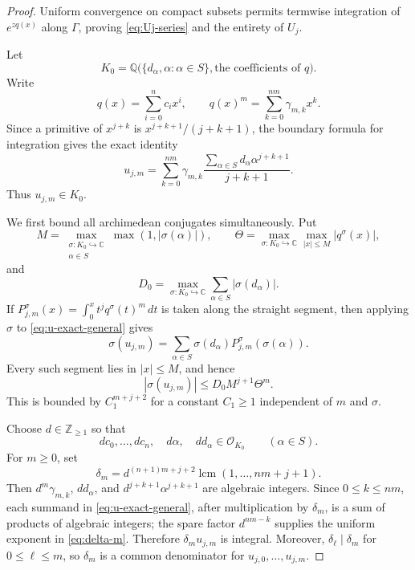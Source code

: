 \documentclass[11pt]{article}
\numberwithin{equation}{section}
\theoremstyle{definition}
\theoremstyle{remark}
\newcommand{\C}{\mathbb C}
\newcommand{\Q}{\mathbb Q}
\begin{document}
\begin{proof}
Uniform convergence on compact subsets permits termwise integration of
$e^{zq(x)}$ along $\Gamma$, proving \eqref{eq:Uj-series} and the entirety of
$U_j$.

Let
\[
  K_0=\Q\bigl(
    \{d_\alpha,\alpha:\alpha\in S\},
    \text{the coefficients of }q
  \bigr).
\]
Write
\[
  q(x)=\sum_{i=0}^n c_ix^i,
  \qquad
  q(x)^m=\sum_{k=0}^{nm}\gamma_{m,k}x^k.
\]
Since a primitive of $x^{j+k}$ is $x^{j+k+1}/(j+k+1)$, the boundary formula
for integration gives the exact identity
\begin{equation}\label{eq:u-exact-general}
  u_{j,m}
  =\sum_{k=0}^{nm}\gamma_{m,k}
    \frac{\displaystyle\sum_{\alpha\in S}
      d_\alpha\alpha^{j+k+1}}{j+k+1}.
\end{equation}
Thus $u_{j,m}\in K_0$.

We first bound all archimedean conjugates simultaneously.  Put
\[
  M=\max_{\substack{\sigma:K_0\hookrightarrow\C\\\alpha\in S}}
      \max(1,|\sigma(\alpha)|),
  \qquad
  \Theta=\max_{\sigma:K_0\hookrightarrow\C}
          \max_{|x|\le M}|q^\sigma(x)|,
\]
and
\[
  D_0=\max_{\sigma:K_0\hookrightarrow\C}
      \sum_{\alpha\in S}|\sigma(d_\alpha)|.
\]
If $P_{j,m}^\sigma(x)=\int_0^x t^j q^\sigma(t)^m\,dt$ is taken along the
straight segment, then applying $\sigma$ to \eqref{eq:u-exact-general} gives
\[
  \sigma(u_{j,m})
  =\sum_{\alpha\in S}\sigma(d_\alpha)
    P_{j,m}^\sigma(\sigma(\alpha)).
\]
Every such segment lies in $|x|\le M$, and hence
\[
  |\sigma(u_{j,m})|
  \le D_0 M^{j+1}\Theta^m.
\]
This is bounded by $C_1^{m+j+2}$ for a constant $C_1\ge1$ independent of
$m$ and $\sigma$.

Choose $d\in\mathbb Z_{\ge1}$ so that
\[
  dc_0,\ldots,dc_n,\quad
  d\alpha,\quad dd_\alpha
  \in\mathcal O_{K_0}
  \qquad(\alpha\in S).
\]
For $m\ge0$, set
\begin{equation}\label{eq:delta-m}
  \delta_m
  =d^{(n+1)m+j+2}
   \operatorname{lcm}(1,\ldots,nm+j+1).
\end{equation}
Then $d^m\gamma_{m,k}$, $dd_\alpha$, and
$d^{j+k+1}\alpha^{j+k+1}$ are algebraic integers.  Since $0\le k\le nm$,
each summand in \eqref{eq:u-exact-general}, after multiplication by
$\delta_m$, is a sum of products of algebraic integers; the spare factor
$d^{nm-k}$ supplies the uniform exponent in \eqref{eq:delta-m}.  Therefore
$\delta_mu_{j,m}$ is integral.  Moreover, $\delta_\ell\mid\delta_m$ for
$0\le\ell\le m$, so $\delta_m$ is a common denominator for
$u_{j,0},\ldots,u_{j,m}$.


\end{proof}
\end{document}
